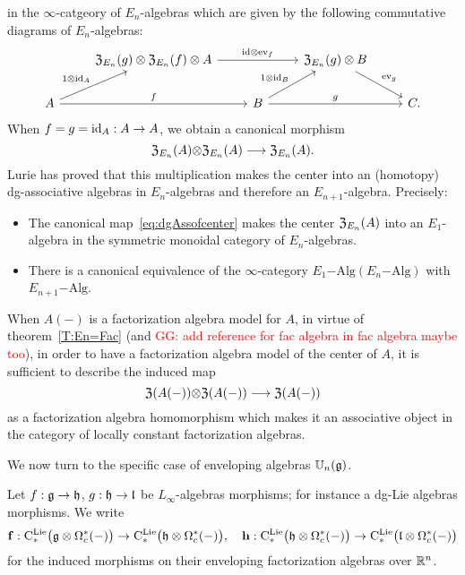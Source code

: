 \documentclass[11pt]{amsart}
\numberwithin{equation}{section}
\def\greg{\textcolor{red}{GG: }\textcolor{red}}
\begin{document}
in the $\infty$-catgeory of $E_n$-algebras which are given by the  
following commutative diagrams of $E_n$-algebras:
\[\begin{tikzcd}
&   {\frak Z}_{E_n}(g) \otimes  {\frak Z}_{E_n}(f) \otimes A \arrow[rr, "\id\otimes \ev_f"] &&  {\frak Z}_{E_n}(g) \otimes  B \arrow[dr, "\ev_g"]\\
A \arrow[ur, "1\otimes \id_A"] \arrow[rr, "f"] && B \arrow[rr, "g"] \arrow[ur, "1\otimes \id_B"] && C. 
\end{tikzcd}\]
 When $f=g={\rm id}_A:A\to A$, we obtain a canonical morphism \begin{equation} \label{eq:dgAssofcenter}
 {\frak Z}_{E_n}(A){\otimes} {\frak Z}_{E_n}(A) \longrightarrow {\frak Z}_{E_n}(A).\end{equation}
 Lurie has proved that this multiplication makes the center into an (homotopy) dg-associative algebras in $E_n$-algebras 
 and therefore an $E_{n+1}$-algebra. Precisely: 
\begin{prp} \label{P:PtyCenter}
\begin{itemize}
 \item The canonical map~\eqref{eq:dgAssofcenter} makes the center ${\frak Z}_{E_n}(A)$ into an $E_1$-algebra in the symmetric monoidal category of 
 $E_n$-algebras.
 \item There is a canonical equivalence of the $\infty$-category $E_1\mathrm{-Alg}(E_n\mathrm{-Alg})$ with $E_{n+1}\mathrm{-Alg}$.
\end{itemize}
\end{prp}
When $A(-)$ is a factorization algebra model for $A$, in virtue of theorem~\ref{T:En=Fac} 
(and \greg{add reference for fac algebra in fac algebra maybe too}), in order to have a factorization algebra 
model of the center of $A$, it is sufficient to describe the induced map 
\[{\frak Z}(A(-)){\otimes} {\frak Z}(A(-)) \longrightarrow {\frak Z}(A(-))\]
as a factorization algebra homomorphism which makes it an associative object in the category of locally constant factorization algebras.

\smallskip

We now turn to the specific case   of enveloping algebras $\mathbb U_n(\mathfrak g)$.

Let $f: \mathfrak g \to \mathfrak h$, $g: \mathfrak h \to \mathfrak l$ be  $L_\infty$-algebras morphisms; for instance a dg-Lie algebras morphisms. We write 
\[ \mathbf{f}:{\rm C}^{\rm Lie}_*\big(\mathfrak g \otimes \Omega^*_c(-)\big) \to  {\rm C}^{\rm Lie}_*\big(\mathfrak h \otimes \Omega^*_c(-)\big), \quad 
\mathbf{h}:{\rm C}^{\rm Lie}_*\big(\mathfrak h \otimes \Omega^*_c(-)\big) \to  {\rm C}^{\rm Lie}_*\big(\mathfrak l \otimes \Omega^*_c(-)\big)\]
for the induced morphisms on their enveloping factorization algebras over $\mathbb R^n$.
\end{document}
